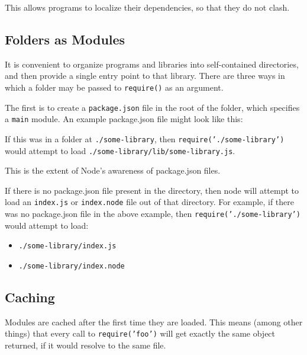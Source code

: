 This allows programs to localize their dependencies, so that they do not
clash.

\subsection{Folders as Modules}

It is convenient to organize programs and libraries into self-contained
directories, and then provide a single entry point to that library.
There are three ways in which a folder may be passed to
\texttt{require()} as an argument.

The first is to create a \texttt{package.json} file in the root of the
folder, which specifies a \texttt{main} module. An example package.json
file might look like this:

\begin{Shaded}
\begin{Highlighting}[]
\NormalTok{\{ } \NormalTok{: }\NormalTok{,}
   \NormalTok{: } \NormalTok{\}}
\end{Highlighting}
\end{Shaded}

If this was in a folder at \texttt{./some-library}, then
\texttt{require('./some-library')} would attempt to load
\texttt{./some-library/lib/some-library.js}.

This is the extent of Node's awareness of package.json files.

If there is no package.json file present in the directory, then node
will attempt to load an \texttt{index.js} or \texttt{index.node} file
out of that directory. For example, if there was no package.json file in
the above example, then \texttt{require('./some-library')} would attempt
to load:

\begin{itemize}
\item
  \texttt{./some-library/index.js}
\item
  \texttt{./some-library/index.node}
\end{itemize}

\subsection{Caching}

Modules are cached after the first time they are loaded. This means
(among other things) that every call to \texttt{require('foo')} will get
exactly the same object returned, if it would resolve to the same file.

